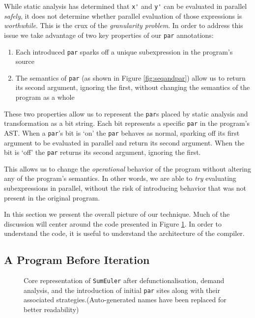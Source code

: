 While static analysis has determined that \verb-x'- and \verb-y'- can be
evaluated in parallel \emph{safely}, it does not determine whether parallel
evaluation of those expressions is \emph{worthwhile}. This is the crux of the
\emph{granularity problem}. In order to address this issue we take advantage of
two key properties of our \verb-par- annotations:

\begin{enumerate}
    \item Each introduced \verb-par- sparks off a unique subexpression
            in the program's source
    \item The semantics of \verb-par- (as shown in Figure \ref{fig:seqandpar})
            allow us to return its second argument, ignoring the first,
            without changing the semantics of the program as a whole
\end{enumerate}

These two properties allow us to represent the \verb-par-s placed by static
analysis and transformation as a bit string. Each bit represents a specific
\verb-par- in the program's AST. When a \verb-par-'s bit is `on' the \verb-par-
behaves as normal, sparking off its first argument to be evaluated in parallel
and return its second argument. When the bit is `off' the \verb-par- returns
its second argument, ignoring the first.

This allows us to change the \emph{operational} behavior of the program without
altering any of the program's semantics. In other words, we are able to \emph{try}
evaluating subexpressions in parallel, without the risk of introducing behavior
that was not present in the original program.


In this section we present the overall picture of our technique. Much of the
discussion will center around the code presented in Figure \ref{sumLast}. In
order to understand the code, it is useful to understand the architecture of the
compiler.

\subsection{A Program Before Iteration}

\begin{figure}[t!]
  
\caption{Core representation of \texttt{SumEuler} after defunctionalisation, demand
         analysis, and the introduction of initial \texttt{par} sites along
         with their associated strategies.(Auto-generated names have been
         replaced for better readability)}
\label{sumLast}
\end{figure}

